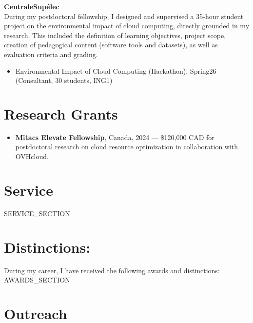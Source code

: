 \documentclass[10pt,a4paper,roman]{moderncv}
\begin{document}
\hfill \break
\textbf{CentraleSupélec}\\

During my postdoctoral fellowship, I designed and supervised a 35-hour student project on the environmental impact of cloud computing, directly grounded in my research. 
This included the definition of learning objectives, project scope, creation of pedagogical content (software tools and datasets), as well as evaluation criteria and grading.\\

\begin{itemize}
    \item Environmental Impact of Cloud Computing (Hackathon). Spring26 (Consultant, 30 students, ING1)
\end{itemize}


\section{Research Grants} %

\begin{itemize}
    \item {\textbf{Mitacs Elevate Fellowship}, Canada, 2024 — \$120,000 CAD for postdoctoral research on cloud resource optimization in collaboration with OVHcloud.}
\end{itemize}

\section{Service}

{{SERVICE_SECTION}}

\section{Distinctions:}

During my career, I have received the following awards and distinctions:\\

{{AWARDS_SECTION}}

\section{Outreach}
\end{document}
